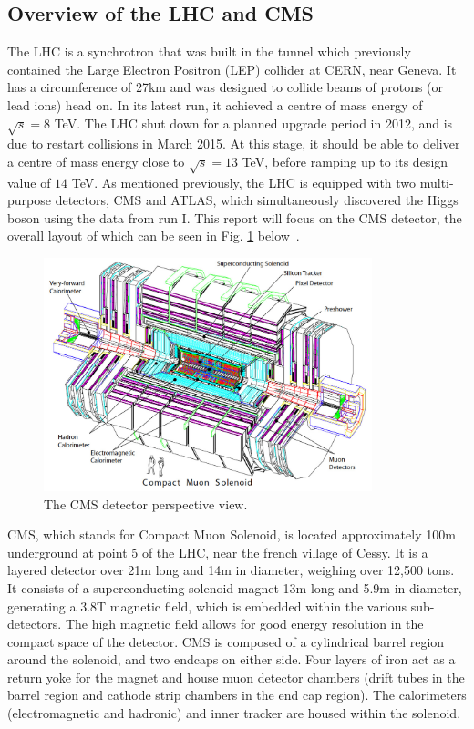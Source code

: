 \documentclass[10pt]{article}
\begin{document}
\subsection{Overview of the LHC and CMS}
The LHC is a synchrotron that was built in the tunnel which previously contained the Large Electron Positron (LEP) collider at CERN, near Geneva. It has a circumference of 27km and was designed to collide beams of protons (or lead ions) head on. In its latest run, it achieved a centre of mass energy of $\sqrt{s}=8$ TeV. The LHC shut down for a planned upgrade period in 2012, and is due to restart collisions in March 2015. At this stage, it should be able to deliver a centre of mass energy close to $\sqrt{s}=13$ TeV, before ramping up to its design value of $14$ TeV. 
As mentioned previously, the LHC is equipped with two multi-purpose detectors, CMS and ATLAS, which simultaneously discovered the Higgs boson using the data from run I. This report will focus on the CMS detector, the overall layout of which can be seen in Fig. \ref{cms} below~\cite{CMSTDR}.

\begin{figure}[h]
  \centering
  \includegraphics[width=0.85\textwidth]{"CMSExploded"}
  \caption{The CMS detector perspective view.}
  \label{cms}
\end{figure}
CMS, which stands for Compact Muon Solenoid, is located approximately 100m underground at point 5 of the LHC, near the french village of Cessy. It is a layered detector over 21m long and 14m in diameter, weighing over 12,500 tons. It consists of a superconducting solenoid magnet 13m long and 5.9m in diameter, generating a 3.8T magnetic field, which is embedded within the various sub-detectors. The high magnetic field allows for good energy resolution in the compact space of the detector. CMS is composed of a cylindrical barrel region around the solenoid, and two endcaps on either side. Four layers of iron act as a return yoke for the magnet and house muon detector chambers (drift tubes in the barrel region and cathode strip chambers in the end cap region). The calorimeters (electromagnetic and hadronic) and inner tracker are housed within the solenoid. 
\end{document}
